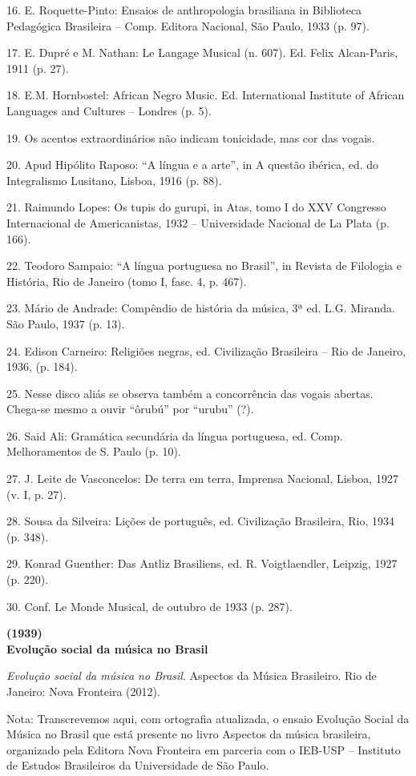 16. E. Roquette-Pinto: Ensaios de anthropologia brasiliana in Biblioteca
Pedagógica Brasileira -- Comp. Editora Nacional, São Paulo, 1933 (p.
97).

17. E. Dupré e M. Nathan: Le Langage Musical (n. 607). Ed. Felix
Alcan-Paris, 1911 (p. 27).

18. E.M. Hornbostel: African Negro Music. Ed. International Institute of
African Languages and Cultures -- Londres (p. 5).

19. Os acentos extraordinários não indicam tonicidade, mas cor das
vogais.

20. Apud Hipólito Raposo: ``A língua e a arte'', in A questão ibérica,
ed. do Integralismo Lusitano, Lisboa, 1916 (p. 88).

21. Raimundo Lopes: Os tupis do gurupi, in Atas, tomo I do XXV Congresso
Internacional de Americanistas, 1932 -- Universidade Nacional de La
Plata (p. 166).

22. Teodoro Sampaio: ``A língua portuguesa no Brasil'', in Revista de
Filologia e História, Rio de Janeiro (tomo I, fasc. 4, p. 467).

23. Mário de Andrade: Compêndio de história da música, 3ª ed. L.G.
Miranda. São Paulo, 1937 (p. 13).

24. Edison Carneiro: Religiões negras, ed. Civilização Brasileira -- Rio
de Janeiro, 1936, (p. 184).

25. Nesse disco aliás se observa também a concorrência das vogais
abertas. Chega-se mesmo a ouvir ``ôrubú'' por ``urubu'' (?).

26. Said Ali: Gramática secundária da língua portuguesa, ed. Comp.
Melhoramentos de S. Paulo (p. 10).

27. J. Leite de Vasconcelos: De terra em terra, Imprensa Nacional,
Lisboa, 1927 (v. I, p. 27).

28. Sousa da Silveira: Lições de português, ed. Civilização Brasileira,
Rio, 1934 (p. 348).

29. Konrad Guenther: Das Antliz Brasiliens, ed. R. Voigtlaendler,
Leipzig, 1927 (p. 220).

30. Conf. Le Monde Musical, de outubro de 1933 (p. 287).

\textbf{(1939)}\\[2\baselineskip]\protect\hypertarget{y6pn2vx6zdf}{}{}\textbf{Evolução
social da música no Brasil}

\emph{Evolução social da música no Brasil}. Aspectos da Música
Brasileiro. Rio de Janeiro: Nova Fronteira (2012).

Nota: Transcrevemos aqui, com ortografia atualizada, o ensaio Evolução
Social da Música no Brasil que está presente no livro Aspectos da música
brasileira, organizado pela Editora Nova Fronteira em parceria com o
IEB-USP -- Instituto de Estudos Brasileiros da Universidade de São
Paulo.

